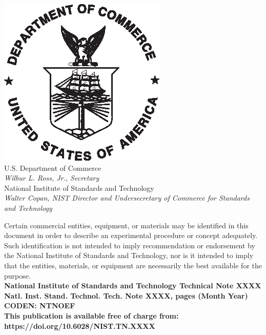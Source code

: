 \documentclass[12pt]{article}
\newcommand{\pubnumber}{XXXX}
\newcommand{\DOI}{https://doi.org/10.6028/NIST.TN.XXXX}
\newcommand{\monthyear}{Month Year}
\begin{document}
\begin{titlepage}
\begin{flushright}
\includegraphics[width=0.18\linewidth]{DoC-logo.eps}\\
\vfill
\footnotesize U.S. Department of Commerce\\
\textit{Wilbur L. Ross, Jr., Secretary}\\
\vspace{10pt}
National Institute of Standards and Technology\\
\textit{Walter Copan, NIST Director and Undersecretary of Commerce for Standards and Technology}
\end{flushright}
\end{titlepage}

\begin{titlepage}
\begin{flushright}
\footnotesize  Certain commercial entities, equipment, or materials may be identified in this document in order to describe an experimental procedure or concept adequately. Such identification is not intended to imply recommendation or endorsement by the National Institute of Standards and Technology, nor is it intended to imply that the entities, materials, or equipment are necessarily the best available for the purpose.\\
\vfill
\normalsize \textbf{National Institute of Standards and Technology Technical Note \pubnumber\\
Natl. Inst. Stand. Technol. Tech. Note \pubnumber, \pageref{LastPage} pages (\monthyear)} \\
\textbf{CODEN: NTNOEF}\\
\vspace{12pt}
\textbf{This publication is available free of charge from: \DOI}
\vfill
\end{flushright}
\end{titlepage}
\end{document}
